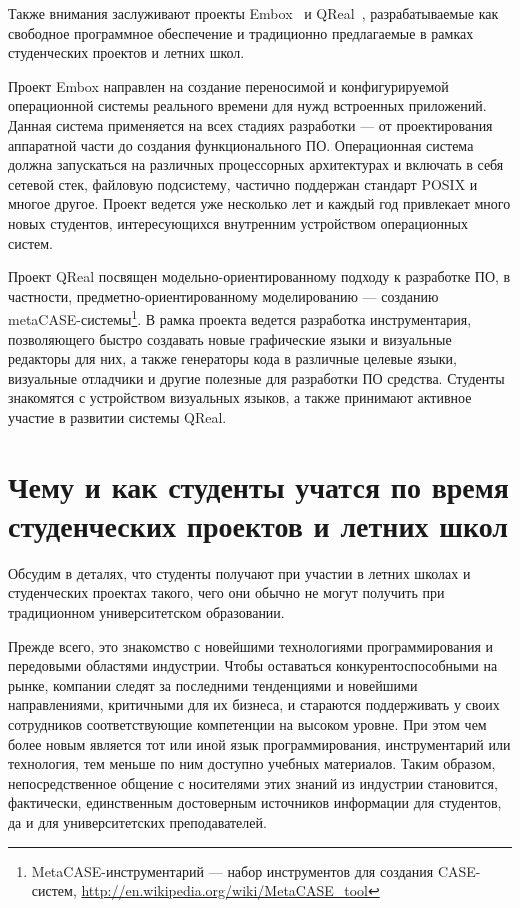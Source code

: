 \documentclass[a4paper]{article}
\begin{document}
Также внимания заслуживают проекты Embox~\cite{embox} и QReal~\cite{qreal2, qreal3, qreal}, разрабатываемые как свободное программное обеспечение и традиционно предлагаемые в рамках студенческих проектов и летних школ. 

Проект Embox направлен на создание переносимой  и конфигурируемой операционной системы реального времени для нужд встроенных приложений. Данная система применяется на всех стадиях разработки --- от проектирования аппаратной части до создания функционального ПО. Операционная система  должна запускаться на различных процессорных архитектурах и включать в себя сетевой стек, файловую подсистему, частично поддержан стандарт POSIX и многое другое. Проект ведется уже несколько лет и каждый год привлекает много новых студентов, интересующихся внутренним устройством операционных систем.  

Проект QReal посвящен модельно-ориентированному подходу к разработке ПО, в частности, предметно-ориентированному моделированию --- созданию metaCASE-системы\footnote{MetaCASE-инструментарий --- набор инструментов для создания CASE-систем, \url{http://en.wikipedia.org/wiki/MetaCASE_tool}}. В рамка проекта ведется разработка инструментария, позволяющего быстро создавать новые графические языки и визуальные редакторы для них, а также генераторы кода в различные целевые языки, визуальные отладчики и другие полезные для разработки ПО средства. Студенты знакомятся с устройством визуальных языков, а также принимают активное участие в развитии системы QReal.

\section{Чему и как студенты учатся по время студенческих проектов и летних школ}

Обсудим в деталях, что студенты получают при участии в летних школах и студенческих проектах такого, чего они обычно не могут получить при традиционном университетском образовании.

Прежде всего, это знакомство с новейшими технологиями программирования и передовыми областями индустрии. Чтобы оставаться конкурентоспособными на рынке, компании следят за последними тенденциями и новейшими направлениями, критичными для их бизнеса, и стараются поддерживать у своих сотрудников соответствующие компетенции на высоком уровне. При этом чем более новым является тот или иной язык программирования, инструментарий или технология, тем меньше по ним доступно учебных материалов. Таким образом, непосредственное общение с носителями этих знаний из индустрии становится, фактически, единственным достоверным источников информации для студентов, да и для университетских преподавателей.  
\end{document}
